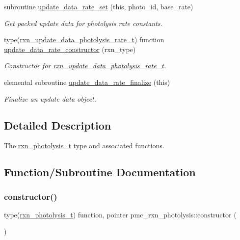 \begin{DoxyCompactItemize}
subroutine \mbox{\hyperlink{namespacepmc__rxn__photolysis_a83d27d14ea7ff279329cc7cad6cd616c}{update\+\_\+data\+\_\+rate\+\_\+set}} (this, photo\+\_\+id, base\+\_\+rate)
\begin{DoxyCompactList}\small\item\em Get packed update data for photolysis rate constants. \end{DoxyCompactList}\item 
type(\mbox{\hyperlink{structpmc__rxn__photolysis_1_1rxn__update__data__photolysis__rate__t}{rxn\+\_\+update\+\_\+data\+\_\+photolysis\+\_\+rate\+\_\+t}}) function \mbox{\hyperlink{namespacepmc__rxn__photolysis_a4fe4efadea794efc7519232ef99ff299}{update\+\_\+data\+\_\+rate\+\_\+constructor}} (rxn\+\_\+type)
\begin{DoxyCompactList}\small\item\em Constructor for \mbox{\hyperlink{structpmc__rxn__photolysis_1_1rxn__update__data__photolysis__rate__t}{rxn\+\_\+update\+\_\+data\+\_\+photolysis\+\_\+rate\+\_\+t}}. \end{DoxyCompactList}\item 
elemental subroutine \mbox{\hyperlink{namespacepmc__rxn__photolysis_afc60a7f115d5014f760edaf1fefe8c24}{update\+\_\+data\+\_\+rate\+\_\+finalize}} (this)
\begin{DoxyCompactList}\small\item\em Finalize an update data object. \end{DoxyCompactList}\end{DoxyCompactItemize}


\subsection{Detailed Description}
The \mbox{\hyperlink{structpmc__rxn__photolysis_1_1rxn__photolysis__t}{rxn\+\_\+photolysis\+\_\+t}} type and associated functions. 

\subsection{Function/\+Subroutine Documentation}
\mbox{\label{namespacepmc__rxn__photolysis_a707869a2e17f3c990a319ea4f499f817}} 
\subsubsection{\texorpdfstring{constructor()}{constructor()}}
{\footnotesize\ttfamily type(\mbox{\hyperlink{structpmc__rxn__photolysis_1_1rxn__photolysis__t}{rxn\+\_\+photolysis\+\_\+t}}) function, pointer pmc\+\_\+rxn\+\_\+photolysis\+::constructor (\begin{DoxyParamCaption}{ }\end{DoxyParamCaption})}



